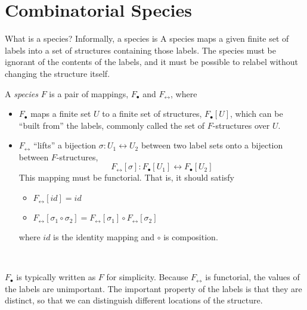 \documentclass{beamer}
\begin{document}
\section{Combinatorial Species}
\begin{frame}{What is a species?}
  Informally, a species is  A species maps a given finite set of labels
  into a set of structures containing those labels. The species must be ignorant of the contents of
  the labels, and it must be possible to relabel without changing the structure itself.
\end{frame}

\begin{frame}
  \begin{definition}
    A \emph{species} \( F \) is a pair of mappings, \( F_\bullet \) and \( F_\leftrightarrow \),
    where
    \begin{itemize}
      \item \( F_\bullet \) maps a finite set \( U \) to a finite set of structures, \( F_\bullet
        [U] \), which can be ``built from'' the labels, commonly called the set of \( F
        \)-structures over \( U \).
      \item \( F_\leftrightarrow \) ``lifts'' a bijection \( \sigma : U_1 \leftrightarrow U_2 \)
        between two label sets onto a bijection between \( F \)-structures,
        \[
          F_\leftrightarrow [\sigma] : F_\bullet [U_1] \leftrightarrow F_\bullet [U_2]
        \]
        This mapping must be functorial. That is, it should satisfy
        \begin{itemize}
          \item \( F_\leftrightarrow [id] = id \)
          \item \( F_\leftrightarrow [\sigma_1 \circ \sigma_2]
            = F_\leftrightarrow [\sigma_1] \circ F_\leftrightarrow [\sigma_2] \)
        \end{itemize}
        where \( id \) is the identity mapping and \( \circ \) is composition.
    \end{itemize}~\cite{bergeron, yorgey}
  \end{definition}
\end{frame}

\begin{frame}
  \( F_\bullet \) is typically written as \( F \) for simplicity. Because \( F_\leftrightarrow \) is
  functorial, the values of the labels are unimportant. The important property of the labels is that
  they are distinct, so that we can distinguish different locations of the structure.
\end{frame}
\end{document}
